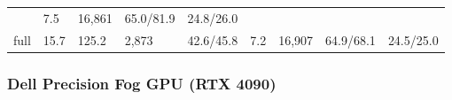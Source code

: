\documentclass[
  9pt, a4paper, landscape]{article}
\begin{document}
\begin{longtable}[]{@{}lllllllll@{}}
\begin{minipage}[t]{0.08\columnwidth}
\end{minipage} & \begin{minipage}[t]{0.08\columnwidth}\raggedright
7.5\strut
\end{minipage} & \begin{minipage}[t]{0.08\columnwidth}\raggedright
16,861\strut
\end{minipage} & \begin{minipage}[t]{0.08\columnwidth}\raggedright
65.0/81.9\strut
\end{minipage} & \begin{minipage}[t]{0.08\columnwidth}\raggedright
24.8/26.0\strut
\end{minipage}\tabularnewline
\begin{minipage}[t]{0.08\columnwidth}\raggedright
full\strut
\end{minipage} & \begin{minipage}[t]{0.08\columnwidth}\raggedright
15.7\strut
\end{minipage} & \begin{minipage}[t]{0.08\columnwidth}\raggedright
125.2\strut
\end{minipage} & \begin{minipage}[t]{0.08\columnwidth}\raggedright
2,873\strut
\end{minipage} & \begin{minipage}[t]{0.08\columnwidth}\raggedright
42.6/45.8\strut
\end{minipage} & \begin{minipage}[t]{0.08\columnwidth}\raggedright
7.2\strut
\end{minipage} & \begin{minipage}[t]{0.08\columnwidth}\raggedright
16,907\strut
\end{minipage} & \begin{minipage}[t]{0.08\columnwidth}\raggedright
64.9/68.1\strut
\end{minipage} & \begin{minipage}[t]{0.08\columnwidth}\raggedright
24.5/25.0\strut
\end{minipage}\tabularnewline
\bottomrule
\end{longtable}

\hypertarget{dell-precision-fog-gpu-rtx-4090}{%
\subsubsection{Dell Precision Fog GPU (RTX
4090)}\label{dell-precision-fog-gpu-rtx-4090}}
\end{document}
